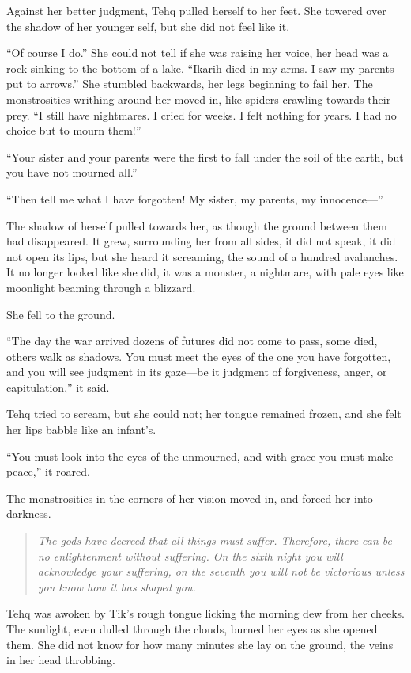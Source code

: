Against her better judgment, Tehq pulled herself to her feet. She towered over the shadow of her younger self, but she did not feel like it.

``Of course I do.'' She could not tell if she was raising her voice, her head was a rock sinking to the bottom of a lake. ``Ikarih died in my arms. I saw my parents put to arrows.'' She stumbled backwards, her legs beginning to fail her. The monstrosities writhing around her moved in, like spiders crawling towards their prey. ``I still have nightmares. I cried for weeks. I felt nothing for years. I had no choice but to mourn them!''

``Your sister and your parents were the first to fall under the soil of the earth, but you have not mourned all.''

``Then tell me what I have forgotten! My sister, my parents, my innocence---''

The shadow of herself pulled towards her, as though the ground between them had disappeared. It grew, surrounding her from all sides, it did not speak, it did not open its lips, but she heard it screaming, the sound of a hundred avalanches. It no longer looked like she did, it was a monster, a nightmare, with pale eyes like moonlight beaming through a blizzard.

She fell to the ground.

``The day the war arrived dozens of futures did not come to pass, some died, others walk as shadows. You must meet the eyes of the one you have forgotten, and you will see judgment in its gaze---be it judgment of forgiveness, anger, or capitulation,'' it said.

Tehq tried to scream, but she could not; her tongue remained frozen, and she felt her lips babble like an infant's.

``You must look into the eyes of the unmourned, and with grace you must make peace,'' it roared.

The monstrosities in the corners of her vision moved in, and forced her into darkness.

\begin{quote}
\emph{The gods have decreed that all things must suffer. Therefore, there can be no enlightenment without suffering. On the sixth night you will acknowledge your suffering, on the seventh you will not be victorious unless you know how it has shaped you.}
\end{quote}

Tehq was awoken by Tik's rough tongue licking the morning dew from her cheeks. The sunlight, even dulled through the clouds, burned her eyes as she opened them. She did not know for how many minutes she lay on the ground, the veins in her head throbbing.

